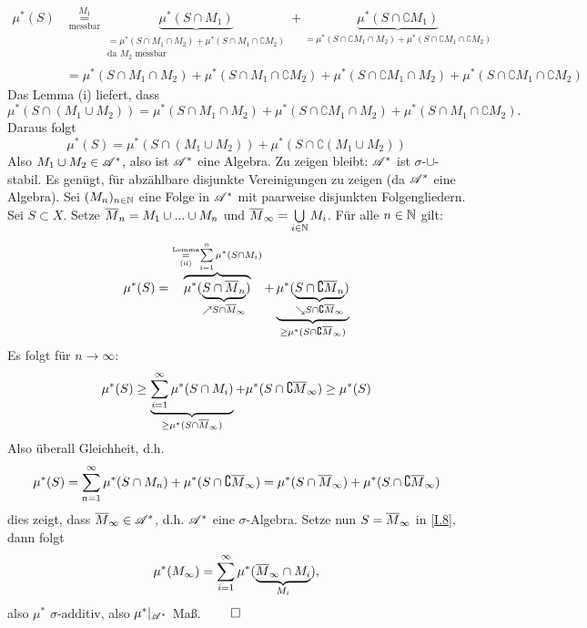 \begin{equation*}
	\begin{split}
	\mu^*(S) & \underset{\text{messbar}}{\overset{M_1}=} 
	\underbrace{\mu^*(S \cap M_1)}_{ \substack{=
	\mu^*(S\cap M_1 \cap M_2) + \mu^* (S \cap M_1 \cap \complement M_2)\\\text{da } M_2 \text{ messbar}} 		} 
	+ \underbrace{\mu^* (S \cap \complement M_1)}_{=\mu^*(S\cap\complement M_1 \cap M_2) +\mu^*(S\cap \complement M_1 \cap \complement M_2)} \\
	& =\mu^*(S\cap M_1 \cap M_2) + \mu^* (S \cap M_1 \cap \complement M_2)+\mu^*(S\cap\complement M_1 \cap M_2) +\mu^*(S\cap \complement M_1 \cap \complement M_2)
	\end{split}
\end{equation*}
Das Lemma (i) liefert, dass \Bild
$$
\mu^*(S\cap (M_1 \cup M_2)) = \mu^*(S\cap M_1 \cap M_2) + \mu^* (S \cap \complement M_1 \cap M_2) + \mu^*(S\cap M_1 \cap \complement M_2).
$$
Daraus folgt
$$
\mu^*(S)= \mu^*(S\cap(M_1\cup M_2))+\mu^*(S\cap \complement (M_1 \cup M_2))
$$
Also $M_1 \cup M_2 \in \AA^*$, also ist $\AA^*$ eine Algebra. Zu zeigen bleibt: $\AA^*$ ist $\sigma$-$\cup$-stabil. Es genügt, für abzählbare disjunkte Vereinigungen zu zeigen (da $\AA^*$ eine Algebra). Sei $(M_n)_{n \in \N}$ eine Folge in $\AA^*$ mit paarweise disjunkten Folgengliedern. Sei $S \subset X$. Setze $\ol{M}_{n}=M_1 \cup ... \cup M_n$ und $\ol{M}_{\infty} = \bigcup\limits_{i\in\N}M_i$. Für alle $n \in \N$ gilt:
\begin{equation*}
\mu^*(S)=\overbrace{\mu^*(\underbrace{S\cap \ol{M}_n}_{\nearrow S \cap \ol{M}_\infty})}^{ \underset{(\text{ii})}{\overset{\text{\tiny Lemma}} {=}}\sum\limits_{i=1}^n\mu^*(S\cap M_i)} + \underbrace{\mu^*(\underbrace{S\cap \complement \ol{M}_n}_{\searrow S \cap \complement \ol{M}_\infty})}_{\geq \mu^*(S\cap \complement \ol{M}_\infty)}
\end{equation*}
Es folgt für $n\longrightarrow \infty$:
\begin{equation*}
	\mu^*(S) \geq \underbrace{\sum_{i=1}^\infty \mu^*(S \cap M_i)}_{\geq \mu^*(S\cap \ol{M}_\infty)} + \mu^*(S\cap \complement \ol{M}_\infty) \geq \mu^*(S)
\end{equation*}
Also überall Gleichheit, d.h.
\begin{equation} \label{I.8}
\mu^*(S) = \sum_{n=1}^\infty \mu^*(S\cap M_n) + \mu^*(S\cap \complement \ol{M}_\infty) =\mu^*(S\cap \ol{M}_\infty) + \mu^* (S \cap \complement \ol{M}_\infty)
\end{equation}
dies zeigt, dass $\ol{M}_\infty \in \AA^*$, d.h. $\AA^*$ eine $\sigma$-Algebra. Setze nun $S= \ol{M}_\infty$ in \eqref{I.8}, dann folgt
\begin{equation*}
\mu^*(M_\infty)=\sum_{i=1}^\infty \mu^*(\underbrace{\ol{M}_\infty \cap M_i}_{M_i}),
\end{equation*}
also $\mu^*$ $\sigma$-additiv, also $\mu^*|_{\AA^*}$ Maß. \hfill $\qed$

